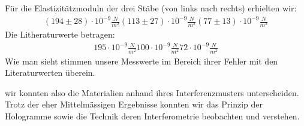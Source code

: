 \documentclass[12pt]{article}
\begin{document}
Für die Elastizitätzmoduln der drei Stäbe (von links nach rechts) erhielten wir:
\begin{align*}
 (194 \pm 28) \cdot 10^{-9} \frac{N}{m^2}
 (113 \pm 27) \cdot 10^{-9} \frac{N}{m^2}
 (77  \pm 13) \cdot 10^{-9} \frac{N}{m^2}
\end{align*}
Die Litheraturwerte betragen:
\begin{align*}
 195  \cdot 10^{-9} \frac{N}{m^2}
 100  \cdot 10^{-9} \frac{N}{m^2}
 72   \cdot 10^{-9} \frac{N}{m^2}
\end{align*}
Wie man sieht stimmen unsere Messwerte im Bereich ihrer Fehler mit den Literaturwerten überein.

wir konnten also die Materialien anhand ihres Interferenzmusters unterscheiden. Trotz der eher Mittelmässigen Ergebnisse konnten wir das Prinzip der Hologramme 
sowie die Technik deren Interferometrie beobachten und verstehen.



%
\end{document}
